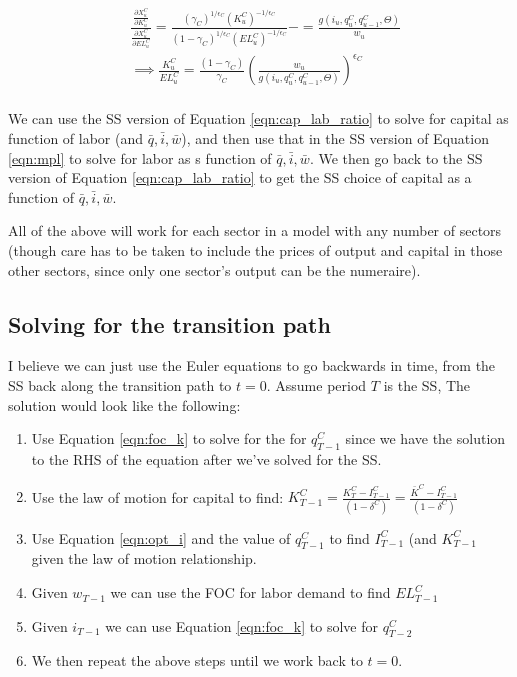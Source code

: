 \begin{equation}
\label{eqn:cap_lab_ratio}
\begin{split}
& \frac{\frac{\partial X^{C}_{u}}{\partial K^{C}_{u}}}{\frac{\partial X^{C}_{u}}{\partial EL^{C}_{u}}} =\frac{(\gamma_{C})^{1/\epsilon_{C}}(K^{C}_{u})^{-1/\epsilon_{C}}}{(1-\gamma_{C})^{1/\epsilon_{C}}(EL^{C}_{u})^{-1/\epsilon_{C}}}-=\frac{g(i_{u},q^{C}_{u},q^{C}_{u-1},\Theta)}{w_{u}} \\
& \implies \frac{K^{C}_{u}}{EL^{C}_{u}} =\frac{(1-\gamma_{C})}{\gamma_{C}}\left(\frac{w_{u}} {g(i_{u},q^{C}_{u},q^{C}_{u-1},\Theta)}\right)^{\epsilon_{C}} \\
\end{split}
\end{equation}

We can use the SS version of Equation \ref{eqn:cap_lab_ratio} to solve for capital as function of labor (and $\bar{q}, \bar{i}, \bar{w}$), and then use that in the SS version of Equation \ref{eqn:mpl} to solve for labor as s function of $\bar{q}, \bar{i}, \bar{w}$.  We then go back to the SS version of Equation \ref{eqn:cap_lab_ratio} to get the SS choice of capital as a function of $\bar{q}, \bar{i}, \bar{w}$.

All of the above will work for each sector in a model with any number of sectors (though care has to be taken to include the prices of output and capital in those other sectors, since only one sector's output can be the numeraire).

\subsection{Solving for the transition path}

I believe we can just use the Euler equations to go backwards in time, from the SS back along the transition path to $t=0$.  Assume period $T$ is the SS,  The solution would look like the following:

\begin{enumerate}
\item Use Equation \ref{eqn:foc_k} to solve for the for $q^{C}_{T-1}$ since we have the solution to the RHS of the equation after we've solved for the SS.
\item Use the law of motion for capital to find: $K^{C}_{T-1}=\frac{K^{C}_{T}-I^{C}_{T-1}}{(1-\delta^{C})}=\frac{\bar{K}^{C}-I^{C}_{T-1}}{(1-\delta^{C})}$
\item Use Equation \ref{eqn:opt_i} and the value of $q^{C}_{T-1}$ to find $I^{C}_{T-1}$ (and $K^{C}_{T-1}$ given the law of motion relationship.
\item Given $w_{T-1}$ we can use the FOC for labor demand to find $EL^{C}_{T-1}$
\item Given $i_{T-1}$ we can use Equation \ref{eqn:foc_k} to solve for $q^{C}_{T-2}$ 
\item We then repeat the above steps until we work back to $t=0$.
\end{enumerate}


